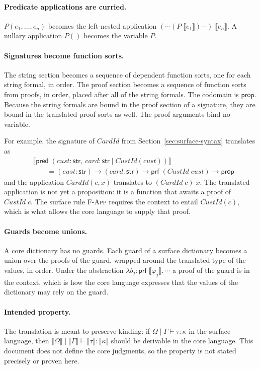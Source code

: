 \documentclass[11pt]{article}
\newcommand{\kw}[1]{\mathsf{#1}}
\newcommand{\str}{\kw{str}}
\newcommand{\prop}{\kw{prop}}
\newcommand{\prf}[1]{\kw{prf}\;#1}
\newcommand{\pred}[1]{\kw{pred}\;#1}
\newcommand{\iabs}[3]{\lambda #1 : #2.\,#3}
\newcommand{\kinding}[4]{#1 \mid #2 \vdash #3 : #4}
\newcommand{\sem}[1]{\llbracket #1 \rrbracket}
\newcommand{\rulename}[1]{\textsc{#1}}
\theoremstyle{remark}
\begin{document}
\paragraph{Predicate applications are curried.} $P(e_1, \ldots, e_n)$ becomes the left-nested
application $(\cdots(P\;\sem{e_1})\cdots)\;\sem{e_n}$. A nullary application $P()$ becomes the
variable $P$.

\paragraph{Signatures become function sorts.} The string section becomes a sequence of dependent
function sorts, one for each string formal, in order. The proof section becomes a sequence of
function sorts from proofs, in order, placed after all of the string formals. The codomain is
$\prop$. Because the string formals are bound in the proof section of a signature, they are bound
in the translated proof sorts as well. The proof arguments bind no variable.

For example, the signature of $\mathit{CardId}$ from Section~\ref{sec:surface-syntax} translates
as
\begin{align*}
& \sem{\pred{(\mathit{cust} : \str,\ \mathit{card} : \str \mid \mathit{CustId}(\mathit{cust}))}} \\
& \qquad = (\mathit{cust} : \str) \to (\mathit{card} : \str) \to
       \prf{(\mathit{CustId}\;\mathit{cust})} \to \prop
\end{align*}
and the application $\mathit{CardId}(c, x)$ translates to $(\mathit{CardId}\;c)\;x$. The translated
application is not yet a proposition: it is a function that awaits a proof of
$\mathit{CustId}\;c$. The surface rule \rulename{F-App} requires the context to entail
$\mathit{CustId}(c)$, which is what allows the core language to supply that proof.

\paragraph{Guards become unions.} A core dictionary has no guards. Each guard of a surface
dictionary becomes a union over the proofs of the guard, wrapped around the translated type of the
values, in order. Under the abstraction $\iabs{b_j}{\prf{\sem{\varphi_j}}}{\cdots}$ a proof of the
guard is in the context, which is how the core language expresses that the values of the
dictionary may rely on the guard.

\paragraph{Intended property.} The translation is meant to preserve kinding: if
$\kinding{\Omega}{\Gamma}{\tau}{\kappa}$ in the surface language, then
$\kinding{\sem{\Omega}}{\sem{\Gamma}}{\sem{\tau}}{\sem{\kappa}}$ should be derivable in the core
language. This document does not define the core judgments, so the property is not stated
precisely or proven here.
\end{document}
